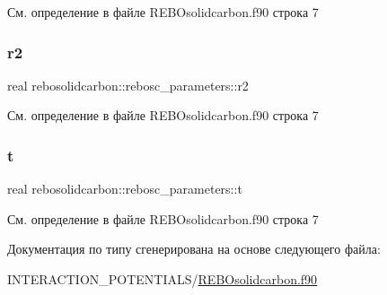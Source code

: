 См. определение в файле R\+E\+B\+Osolidcarbon.\+f90 строка 7

\mbox{\label{structrebosolidcarbon_1_1rebosc__parameters_a3652210187bb250bcbf9ab2d3db9dc66}} 
\subsubsection{\texorpdfstring{r2}{r2}}
{\footnotesize\ttfamily real rebosolidcarbon\+::rebosc\+\_\+parameters\+::r2}



См. определение в файле R\+E\+B\+Osolidcarbon.\+f90 строка 7

\mbox{\label{structrebosolidcarbon_1_1rebosc__parameters_a7e00bed4e7bf3535140ddae6ea9c0ad2}} 
\subsubsection{\texorpdfstring{t}{t}}
{\footnotesize\ttfamily real rebosolidcarbon\+::rebosc\+\_\+parameters\+::t}



См. определение в файле R\+E\+B\+Osolidcarbon.\+f90 строка 7



Документация по типу сгенерирована на основе следующего файла\+:\begin{DoxyCompactItemize}
\item 
I\+N\+T\+E\+R\+A\+C\+T\+I\+O\+N\+\_\+\+P\+O\+T\+E\+N\+T\+I\+A\+L\+S/\mbox{\hyperlink{_r_e_b_osolidcarbon_8f90}{R\+E\+B\+Osolidcarbon.\+f90}}\end{DoxyCompactItemize}
